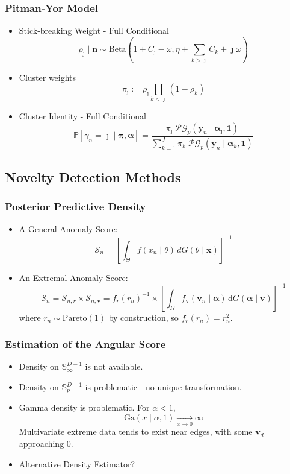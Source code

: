 \documentclass[aspectratio=169,10pt]{beamer}
\begin{document}
\begin{frame}
    \frametitle{Pitman-Yor Model}
    \begin{itemize}
    \item Stick-breaking Weight - Full Conditional
    \[
    \rho_{\jmath} \mid \bm{n} \sim \text{Beta}\left(1 + C_{\jmath} - \omega, 
            \eta + \sum_{k > \jmath} C_k + \jmath \omega\right)
    \]
    \item Cluster weights
    \[
        \pi_{\jmath} := \rho_{\jmath} \prod_{k < \jmath}(1 - \rho_k)
    \]
    \item Cluster Identity - Full Conditional
    \[
    \mathbb{P}\left[\gamma_n = \jmath \mid \bm{\pi},\bm{\alpha}\right] =
            \frac{\pi_{\jmath}\;\mathcal{PG}_p\left(\bm{y}_n\mid\bm{\alpha}_{\jmath},\bm{1}\right)}{
                \sum_{k = 1}^J \pi_k\;
                \mathcal{PG}_p\left(\bm{y}_n\mid\bm{\alpha}_k,\bm{1}\right)}
    \]
    \end{itemize}
\end{frame} %

\subsection{Novelty Detection Methods}

\begin{frame}
    \frametitle{Posterior Predictive Density}
    \begin{itemize}
        \item A General Anomaly Score:
        \[
            \mathcal{S}_n = \left[\int_{\Theta}f(x_n\mid\theta)\,dG(\theta\mid\bm{x})\right]^{-1}
        \]
        \item An Extremal Anomaly Score:
        \[
            \mathcal{S}_n = \mathcal{S}_{n,r} \times \mathcal{S}_{n,\bm{v}}
                = f_r(r_n)^{-1}\times \left[\int_{\Omega}f_{\bm{v}}(\bm{v}_n\mid\bm{\alpha})\,\text{d}G(\bm{\alpha}\mid\bm{v})\right]^{-1}
        \]
        where $r_n\sim\text{Pareto}(1)$ by construction, so $f_r(r_n) = r_n^2$.
    \end{itemize}
\end{frame} %

\begin{frame}
    \frametitle{Estimation of the Angular Score}
    \begin{itemize}
        \item Density on $\mathbb{S}_{\infty}^{D-1}$ is not available.
        \item Density on $\mathbb{S}_p^{D-1}$ is problematic---no unique transformation.
        \item Gamma density is problematic.  For 
            $\alpha < 1$, \[\text{Ga}(x\mid\alpha, 1) \xrightarrow[x\to0]{} \infty\]
        Multivariate extreme data tends to exist near edges, with some $\bm{v}_d$ approaching 0.
        \item Alternative Density Estimator?
    \end{itemize}
\end{frame} %
\end{document}
